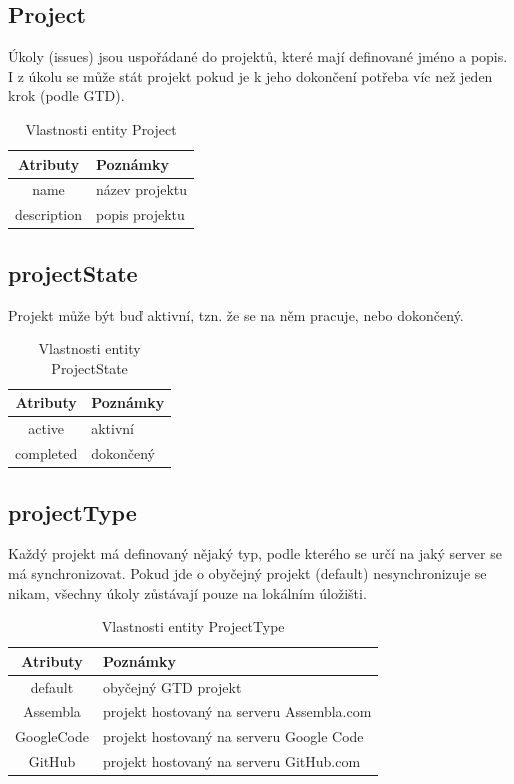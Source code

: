 \subsection{Project}
Úkoly (issues) jsou uspořádané do projektů, které mají definované jméno a popis. I z úkolu se může stát projekt pokud je k jeho dokončení potřeba víc než jeden krok (podle GTD).

\begin{table}[h]
\begin{center}
	\begin{tabular}{|c|l|}
	\hline
	Atributy & Poznámky \\
	\hline
	name & název projektu \\
	description & popis projektu \\
	\hline
	\end{tabular}
\end{center}
\caption{Vlastnosti entity Project}
\label{tab:project}
\end{table}

\subsection{projectState}
Projekt může být buď aktivní, tzn. že se na něm pracuje, nebo dokončený.

\begin{table}[h]
\begin{center}
	\begin{tabular}{|c|l|}
	\hline
	Atributy & Poznámky \\
	\hline
	active & aktivní \\
	completed & dokončený \\
	\hline
	\end{tabular}
\end{center}
\caption{Vlastnosti entity ProjectState}
\label{tab:projectState}
\end{table}

\subsection{projectType}

Každý projekt má definovaný nějaký typ, podle kterého se určí na jaký server se má synchronizovat. Pokud jde o obyčejný projekt (default) nesynchronizuje se nikam, všechny úkoly zůstávají pouze na lokálním úložišti.

\begin{table}[h]
\begin{center}
	\begin{tabular}{|c|l|}
	\hline
	Atributy & Poznámky \\
	\hline
	default & obyčejný GTD projekt \\
	Assembla & projekt hostovaný na serveru Assembla.com \\
	GoogleCode & projekt hostovaný na serveru Google Code \\
	GitHub & projekt hostovaný na serveru GitHub.com \\
	\hline
	\end{tabular}
\end{center}
\caption{Vlastnosti entity ProjectType}
\label{tab:projectType}
\end{table}

